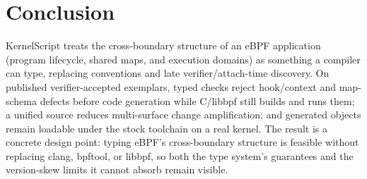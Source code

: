 \documentclass[sigplan,10pt,nonacm]{acmart}
\newcommand{\tool}{KernelScript}
\begin{document}
\section{Conclusion}

\tool{} treats the cross-boundary structure of an eBPF application (program lifecycle, shared maps, and execution domains) as something a compiler can type, replacing conventions and late verifier/attach-time discovery.
On published verifier-accepted exemplars, typed checks reject hook/context and map-schema defects before code generation while C/libbpf still builds and runs them; a unified source reduces multi-surface change amplification; and generated objects remain loadable under the stock toolchain on a real kernel.
The result is a concrete design point: typing eBPF's cross-boundary structure is feasible without replacing clang, bpftool, or libbpf, so both the type system's guarantees and the version-skew limits it cannot absorb remain visible.

\newpage


\end{document}
